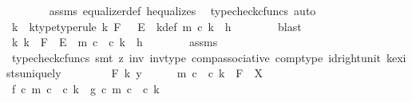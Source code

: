 \begin{isabellebody}
\ \ \ \ \ \ \isamarkupfalse%
\ assms\ equalizer{\isacharunderscore}{\kern0pt}def{}\ h{\isacharunderscore}{\kern0pt}equalizes\ \isamarkupfalse%
\ {\isacharparenleft}{\kern0pt}typecheck{\isacharunderscore}{\kern0pt}cfuncs{\isacharcomma}{\kern0pt}\ auto{\isacharparenright}{\kern0pt}\isanewline
\ \ \ \ \isamarkupfalse%
\ \isamarkupfalse%
\ k\ \ k{\isacharunderscore}{\kern0pt}type{\isacharbrackleft}{\kern0pt}type{\isacharunderscore}{\kern0pt}rule{\isacharbrackright}{\kern0pt}{\isacharcolon}{\kern0pt}\ {\isachardoublequoteopen}k{\isacharcolon}{\kern0pt}\ F\ \ {\isasymrightarrow}\ E{\isachardoublequoteclose}\ \ k{\isacharunderscore}{\kern0pt}def{\isacharcolon}{\kern0pt}\ {\isachardoublequoteopen}m\ {\isasymcirc}\isactrlsub c\ k\ {\isacharequal}{\kern0pt}\ h{\isachardoublequoteclose}\isanewline
\ \ \ \ \ \ \isamarkupfalse%
\ blast\isanewline
\ \ \ \ \isamarkupfalse%
\ \isamarkupfalse%
\ {\isachardoublequoteopen}{\isasymexists}k{\isachardot}{\kern0pt}\ k\ {\isacharcolon}{\kern0pt}\ F\ {\isasymrightarrow}\ E{\isacharprime}{\kern0pt}\ {\isasymand}\ {\isacharparenleft}{\kern0pt}m\ {\isasymcirc}\isactrlsub c\ {\isasymphi}{\isacharparenright}{\kern0pt}\ {\isasymcirc}\isactrlsub c\ k\ {\isacharequal}{\kern0pt}\ h{\isachardoublequoteclose}\isanewline
\ \ \ \ \ \ \isamarkupfalse%
\ assms\ \isamarkupfalse%
\ {\isacharparenleft}{\kern0pt}typecheck{\isacharunderscore}{\kern0pt}cfuncs{\isacharcomma}{\kern0pt}\ smt\ {\isacharparenleft}{\kern0pt}z{}{\isacharparenright}{\kern0pt}\ {\isasymphi}{\isasymphi}{\isacharunderscore}{\kern0pt}inv\ {\isasymphi}{\isacharunderscore}{\kern0pt}inv{\isacharunderscore}{\kern0pt}type\ comp{\isacharunderscore}{\kern0pt}associative{}\ comp{\isacharunderscore}{\kern0pt}type\ id{\isacharunderscore}{\kern0pt}right{\isacharunderscore}{\kern0pt}unit{}\ k{\isacharunderscore}{\kern0pt}exists{\isacharunderscore}{\kern0pt}uniquely{\isacharparenright}{\kern0pt}\isanewline
\ \ \isamarkupfalse%
\isanewline
\ \ \ \ \isamarkupfalse%
\ F\ k\ y\isanewline
\ \ \ \ \isamarkupfalse%
\ {\isachardoublequoteopen}{\isacharparenleft}{\kern0pt}m\ {\isasymcirc}\isactrlsub c\ {\isasymphi}{\isacharparenright}{\kern0pt}\ {\isasymcirc}\isactrlsub c\ k\ {\isacharcolon}{\kern0pt}\ F\ {\isasymrightarrow}\ X{\isachardoublequoteclose}\isanewline
\ \ \ \ \isamarkupfalse%
\ {\isachardoublequoteopen}f\ {\isasymcirc}\isactrlsub c\ {\isacharparenleft}{\kern0pt}m\ {\isasymcirc}\isactrlsub c\ {\isasymphi}{\isacharparenright}{\kern0pt}\ {\isasymcirc}\isactrlsub c\ k\ {\isacharequal}{\kern0pt}\ g\ {\isasymcirc}\isactrlsub c\ {\isacharparenleft}{\kern0pt}m\ {\isasymcirc}\isactrlsub c\ {\isasymphi}{\isacharparenright}{\kern0pt}\ {\isasymcirc}\isactrlsub c\ k{\isachardoublequoteclose}\isanewline

\end{isabellebody}
